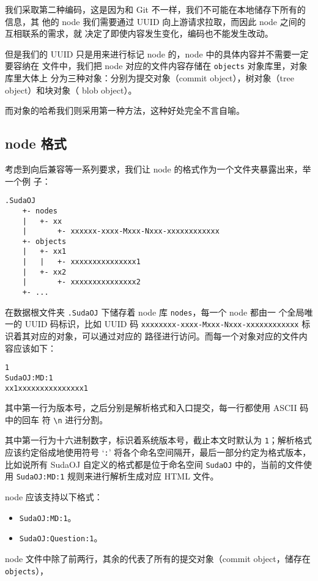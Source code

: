 我们采取第二种编码，这是因为和 Git 不一样，我们不可能在本地储存下所有的信息，其
他的 node 我们需要通过 UUID 向上游请求拉取，而因此 node 之间的互相联系的需求，就
决定了即使内容发生变化，编码也不能发生改动。

但是我们的 UUID 只是用来进行标记 node 的，node 中的具体内容并不需要一定要容纳在
文件中，我们把 node 对应的文件内容存储在 \verb|objects| 对象库里，对象库里大体上
分为三种对象：分别为提交对象（commit object），树对象（tree object）和块对象（
blob object）。

而对象的哈希我们则采用第一种方法，这种好处完全不言自喻。

\subsection{node 格式} \label{fbs::node}
考虑到向后兼容等一系列要求，我们让 node 的格式作为一个文件夹暴露出来，举一个例
子：

\begin{lstlisting}
.SudaOJ
    +- nodes
    |   +- xx
    |       +- xxxxxx-xxxx-Mxxx-Nxxx-xxxxxxxxxxxx
    +- objects
    |   +- xx1
    |   |   +- xxxxxxxxxxxxxxx1
    |   +- xx2
    |       +- xxxxxxxxxxxxxxx2
    +- ...
\end{lstlisting}

在数据根文件夹 \verb|.SudaOJ| 下储存着 node 库 \verb|nodes|，每一个 node 都由一
个全局唯一的 UUID 码标识，比如 UUID 码 %
\verb|xxxxxxxx-xxxx-Mxxx-Nxxx-xxxxxxxxxxxx| 标识着其对应的对象，可以通过对应的
路径进行访问。而每一个对象对应的文件内容应该如下：

\begin{lstlisting}
1
SudaOJ:MD:1
xx1xxxxxxxxxxxxxxx1
\end{lstlisting}

其中第一行为版本号，之后分别是解析格式和入口提交，每一行都使用 ASCII 码中的回车
符 \verb|\n| 进行分割。

其中第一行为十六进制数字，标识着系统版本号，截止本文时默认为 \verb|1|；解析格式
应该约定俗成地使用符号 `\verb|:|' 将各个命名空间隔开，最后一部分约定为格式版本，
比如说所有 SudaOJ 自定义的格式都是位于命名空间 \verb|SudaOJ| 中的，当前的文件使
用 \verb|SudaOJ:MD:1| 规则来进行解析生成对应 HTML 文件。

node 应该支持以下格式：
\begin{itemize}
    \item \verb|SudaOJ:MD:1|。
    \item \verb|SudaOJ:Question:1|。
\end{itemize}

node 文件中除了前两行，其余的代表了所有的提交对象（commit object，储存在 %
\verb|objects|），


